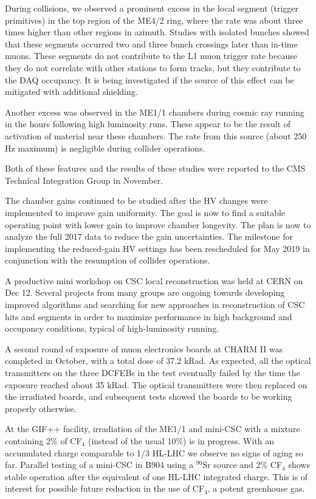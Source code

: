 \documentclass[12pt]{article}
\begin{document}
During collisions, we observed a prominent excess in the local segment (trigger primitives) in the 
top region of the ME4/2 ring, where the rate was about three times higher than other 
regions in azimuth.  Studies with isolated bunches showed that these 
segments occurred two and three bunch crossings later than in-time muons.  These segments
 do not contribute to the L1 muon trigger rate because they do not correlate with other 
stations to form tracks, but they contribute to the DAQ occupancy.  It is being 
investigated if the source of this effect can be mitigated with additional shielding.  

Another excess was observed in the ME1/1 chambers during cosmic ray running in 
the hours following high luminosity runs.  These appear to be the result of 
activation of material near these chambers.  The rate from this source (about 250 Hz 
maximum) is negligible during collider operations. 

Both of these features and the results of these studies were reported to the CMS Technical Integration Group in November. 

The chamber gains continued to be studied after the HV changes were implemented to 
improve gain uniformity.  The goal is now to find a suitable operating point with 
lower gain to improve chamber longevity.  The plan is now to analyze the full 2017
data to reduce the gain uncertainties.  The milestone for implementing the reduced-gain
HV settings has been rescheduled for May 2019 in conjunction with the resumption of
collider operations. 

A productive mini workshop on CSC local reconstruction was held at CERN on Dec 12.  Several projects from many groups are ongoing towards developing improved algorithms and searching for new approaches in reconstruction of CSC hits and segments in order to maximize performance in high background and occupancy conditions, typical of high-luminosity running.  

A second round of exposure of muon electronics boards at CHARM II was completed in October, with 
a total dose of 37.2 kRad.  As expected, all the optical transmitters on the three
 DCFEBs in the test eventually failed by the time the exposure reached about 35 kRad.  The optical transmitters were then replaced on the irradiated boards, and subsequent tests showed the boards to be working properly otherwise.

 At the GIF++ facility, irradiation of the ME1/1 and mini-CSC with a mixture containing 2\% of CF$_4$ (instead of the usual 10\%) is in progress.  With an accumulated charge comparable to 1/3 HL-LHC  we observe no signs of aging so far. Parallel testing of a mini-CSC in B904 using a $^{90}$Sr source and 2\% CF$_4$ shows stable operation after the equivalent of one HL-LHC integrated charge.  This is of interest for possible future reduction in the use of 
CF$_4$, a potent greenhouse gas.
\end{document}
